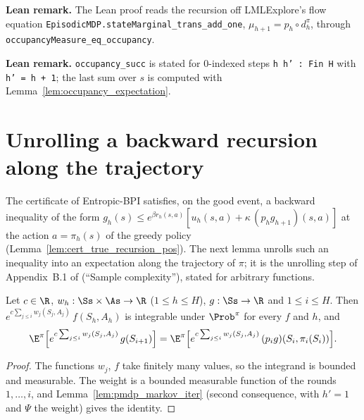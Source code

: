 \textbf{Lean remark.} The Lean proof reads the recursion off LMLExplore's flow equation
\texttt{EpisodicMDP.stateMarginal\_trans\_add\_one}, $\mu_{h+1} = p_h \circ d^\pi_h$, through
\texttt{occupancyMeasure\_eq\_occupancy}.

\textbf{Lean remark.} \texttt{occupancy\_succ} is stated for $0$-indexed steps \texttt{h h' : Fin H}
with \texttt{h' = h + 1}; the last sum over $s$ is computed with
Lemma~\ref{lem:occupancy_expectation}.

\section{Unrolling a backward recursion along the trajectory}
\label{sec:pre_mdp_unroll}

The certificate of Entropic-BPI satisfies, on the good event, a backward inequality of the
form $g_h(s) \le e^{\beta r_h(s,a)}[u_h(s,a) + \kappa\,(p_h g_{h+1})(s,a)]$ at the action
$a = \pi_h(s)$ of the greedy policy (Lemma~\ref{lem:cert_true_recursion_pos}). The next lemma
unrolls such an inequality into an expectation along the trajectory of $\pi$; it is the
unrolling step of Appendix~B.1 of \cite{essakine2026tight} (``Sample complexity''), stated for
arbitrary functions.

\begin{lemma}\label{lem:pmdp_weighted_next_state}
\leanok
{}
Let $c \in \R$, $w_h : \Ss \times \As \to \R$ ($1 \le h \le H$), $g : \Ss \to \R$ and $1 \le i \le H$.
Then $e^{c\sum_{j \le i} w_j(S_j, A_j)}\,f(S_h, A_h)$ is integrable under $\Prob^\pi$ for every
$f$ and $h$, and
\[
  \E^\pi\Big[e^{c\sum_{j \le i} w_j(S_j, A_j)}\,g(S_{i+1})\Big]
  = \E^\pi\Big[e^{c\sum_{j \le i} w_j(S_j, A_j)}\,(p_i g)(S_i, \pi_i(S_i))\Big] .
\]
\end{lemma}

\begin{proof}
\leanok
The functions $w_j$, $f$ take finitely many values, so the integrand is bounded and measurable.
The weight is a bounded measurable function of the rounds $1, \dots, i$, and
Lemma~\ref{lem:pmdp_markov_iter} (second consequence, with $h' = 1$ and $\Psi$ the weight) gives
the identity.
\end{proof}

